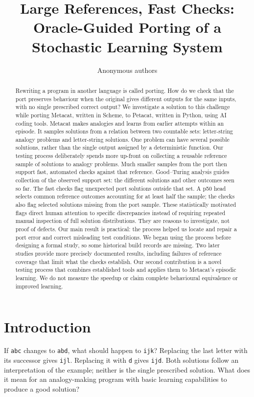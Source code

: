 \documentclass[10pt,letterpaper]{article}
\title{Large References, Fast Checks: Oracle-Guided Porting of a Stochastic Learning
System}
\author{Anonymous authors}
\begin{document}
\maketitle
\begin{abstract}
Rewriting a program in another language is called porting. How do we check that the port
preserves behaviour when the original gives different outputs for the same inputs, with no
single prescribed correct output? We investigate a solution to this challenge while
porting Metacat, written in Scheme, to Petacat, written in Python, using AI coding tools.
Metacat makes analogies and learns from earlier attempts within an episode. It samples
solutions from a relation between two countable sets: letter-string analogy problems and
letter-string solutions. One problem can have several possible solutions, rather than the
single output assigned by a deterministic function. Our testing process deliberately
spends more up-front on collecting a reusable reference sample of solutions to analogy
problems. Much smaller samples from the port then support fast, automated checks against
that reference. Good--Turing analysis guides collection of the observed support set: the
different solutions and other outcomes seen so far. The fast checks flag unexpected port
solutions outside that set. A p50 head selects common reference outcomes accounting for at
least half the sample; the checks also flag selected solutions missing from the port
sample. These statistically motivated flags direct human attention to specific
discrepancies instead of requiring repeated manual inspection of full solution
distributions. They are reasons to investigate, not proof of defects. Our main result is
practical: the process helped us locate and repair a port error and correct misleading
test conditions. We began using the process before designing a formal study, so some
historical build records are missing. Two later studies provide more precisely documented
results, including failures of reference coverage that limit what the checks establish.
Our second contribution is a novel testing process that combines established tools and
applies them to Metacat's episodic learning. We do not measure the speedup or claim
complete behavioural equivalence or improved learning.
\end{abstract}
\section{Introduction}\label{sec:introduction}

If \texttt{abc} changes to \texttt{abd}, what should happen to \texttt{ijk}? Replacing the
last letter with its successor gives \texttt{ijl}. Replacing it with \texttt{d} gives
\texttt{ijd}. Both solutions follow an interpretation of the example; neither is the
single prescribed solution. What does it mean for an analogy-making program with basic
learning capabilities to produce a good solution?
\end{document}
